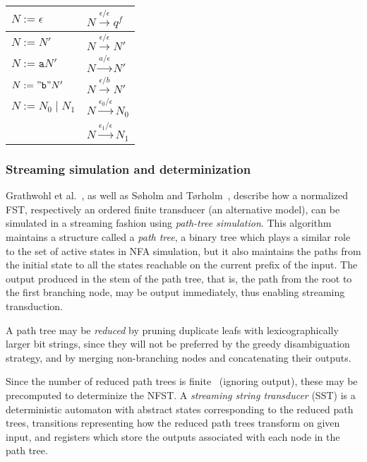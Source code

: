 \begin{center}
  \begin{tabular}{|l|l|}
    \hline
    $N := \epsilon$       & $N \xrightarrow{\epsilon/\epsilon} q^f$   \\
    \hline
    $N := N'$             & $N \xrightarrow{\epsilon/\epsilon} N'$    \\
    \hline
    $N := \mathtt{a}N'$   & $N \xrightarrow{a/\epsilon} N'$           \\
    \hline
    $N := \mathtt{"b"}N'$ & $N \xrightarrow{\epsilon/b} N'$           \\
    \hline
    $N := N_0 \;|\; N_1$  & $N \xrightarrow{\epsilon_0/\epsilon} N_0$ \\
                          & $N \xrightarrow{\epsilon_1/\epsilon} N_1$ \\
    \hline
  \end{tabular}
\end{center}

\subsubsection{Streaming simulation and determinization}

Grathwohl et al.~\cite{grathwohl2016kleenex}, as well as Søholm and
Tørholm~\cite{soholm2015ordered}, describe how a normalized FST, respectively
an ordered finite transducer (an alternative model), can be simulated in a
streaming fashion using \emph{path-tree simulation}. This algorithm maintains a
structure called a \emph{path tree}, a binary tree which plays a similar role
to the set of active states in NFA simulation, but it also maintains the paths
from the initial state to all the states reachable on the current prefix of the
input. The output produced in the stem of the path tree, that is, the path from
the root to the first branching node, may be output immediately, thus enabling
streaming transduction.

A path tree may be \emph{reduced} by pruning duplicate leafs with
lexicographically larger bit strings, since they will not be preferred by the
greedy disambiguation strategy, and by merging non-branching nodes and
concatenating their outputs.

Since the number of reduced path trees is finite~\cite{soholm2015ordered}
(ignoring output), these may be precomputed to determinize the NFST. A
\emph{streaming string transducer} (SST) is a deterministic automaton with
abstract states corresponding to the reduced path trees, transitions
representing how the reduced path trees transform on given input, and registers
which store the outputs associated with each node in the path tree.


